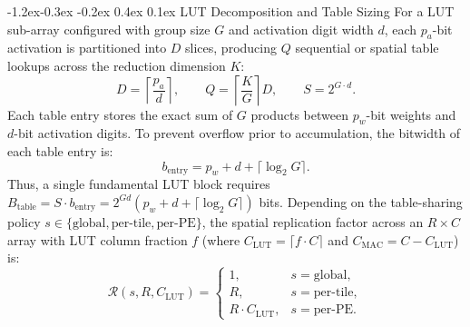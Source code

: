 \documentclass[10pt,letterpaper,twocolumn]{article}
\makeatletter
\renewcommand\subsection{\@startsection{subsection}{2}{\z@}%
  {-1.2ex\@plus -0.3ex \@minus -0.2ex}%
  {0.4ex \@plus 0.1ex}%
  {\normalfont\normalsize\bfseries}}
\makeatother
\begin{document}
\subsection{LUT Decomposition and Table Sizing}
For a LUT sub-array configured with group size $G$ and activation digit width $d$, each $p_a$-bit activation is partitioned into $D$ slices, producing $Q$ sequential or spatial table lookups across the reduction dimension $K$:
\begin{equation}
  D = \left\lceil \frac{p_a}{d} \right\rceil, \qquad
  Q = \left\lceil \frac{K}{G} \right\rceil D, \qquad
  S = 2^{G \cdot d}.
  \label{eq:lut_params}
\end{equation}
Each table entry stores the exact sum of $G$ products between $p_w$-bit weights and $d$-bit activation digits. To prevent overflow prior to accumulation, the bitwidth of each table entry is:
\begin{equation}
  b_{\text{entry}} = p_w + d + \lceil \log_2 G \rceil.
  \label{eq:b_entry}
\end{equation}
Thus, a single fundamental LUT block requires $B_{\text{table}} = S \cdot b_{\text{entry}} = 2^{Gd}(p_w + d + \lceil \log_2 G \rceil)$ bits. Depending on the table-sharing policy $s \in \{\text{global}, \text{per-tile}, \text{per-PE}\}$, the spatial replication factor across an $R \times C$ array with LUT column fraction $f$ (where $C_{\text{LUT}} = \lceil f \cdot C \rceil$ and $C_{\text{MAC}} = C - C_{\text{LUT}}$) is:
\begin{equation}
  \mathcal{R}(s, R, C_{\text{LUT}}) =
  \begin{cases}
    1, & s = \text{global}, \\
    R, & s = \text{per-tile}, \\
    R \cdot C_{\text{LUT}}, & s = \text{per-PE}.
  \end{cases}
  \label{eq:replication}
\end{equation}
\end{document}
